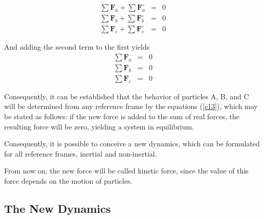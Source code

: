 \documentclass[12pt]{article}
\newcommand{\vF}{\mathbf{F}}
\newcommand{\ra}{_a}
\newcommand{\rb}{_b}
\newcommand{\rc}{_c}
\begin{document}
\begin{eqnarray}
\sum \vF\ra + \sum \vF^{\circ}\ra & = & 0 \nonumber \\
\sum \vF\rb + \sum \vF^{\circ}\rb & = & 0 \label{e12} \\
\sum \vF\rc + \sum \vF^{\circ}\rc & = & 0 \nonumber
\end{eqnarray}
\par And adding the second term to the first yields
\begin{eqnarray}
\sum \vF\ra & = & 0 \nonumber \\
\sum \vF\rb & = & 0 \label{e13} \\
\sum \vF\rc & = & 0 \nonumber
\end{eqnarray}
\par Consequently, it can be established that the behavior of particles A, B, and C will be determined from any reference frame by the equations (\ref{e13}), which may be stated as follows: if the new force is added to the sum of real forces, the resulting force will be zero, yielding a system in equilibrium.
\par Consequently, it is possible to conceive a new dynamics, which can be formulated for all reference frames, inertial and non-inertial.
\par From now on, the new force will be called kinetic force, since the value of this force depends on the motion of particles.

\medskip

{\centering\subsection{The New Dynamics}}
\end{document}
